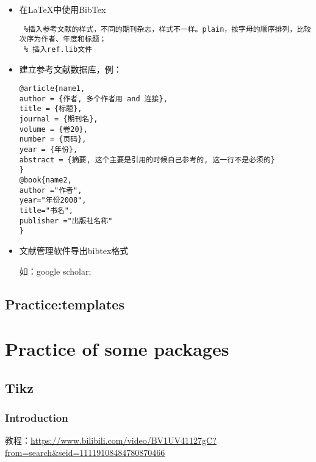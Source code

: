 \documentclass{report}
\begin{document}
\begin{itemize}
\item 在\LaTeX 中使用BibTex

\begin{verbatim}
 %插入参考文献的样式，不同的期刊杂志，样式不一样。plain，按字母的顺序排列，比较次序为作者、年度和标题；
 % 插入ref.lib文件
\end{verbatim}

\item 建立参考文献数据库，例：
\begin{verbatim}
@article{name1,
author = {作者, 多个作者用 and 连接},
title = {标题},
journal = {期刊名},
volume = {卷20},
number = {页码},
year = {年份},
abstract = {摘要, 这个主要是引用的时候自己参考的, 这一行不是必须的}
}
@book{name2,
author ="作者",
year="年份2008",
title="书名",
publisher ="出版社名称"
}
\end{verbatim}

\item 文献管理软件导出bibtex格式

如：google scholar;

\end{itemize}



\chapter{Practice:templates}




\part{Practice of some packages}

\chapter{Tikz}






\section{Introduction}

教程：\url{https://www.bilibili.com/video/BV1UV41127gC?from=search\&seid=11119108484780870466}
\end{document}
